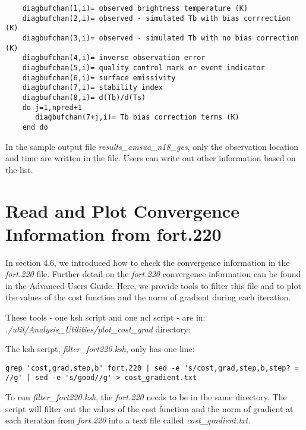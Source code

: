 \begin{scriptsize}
\begin{verbatim}  
    diagbufchan(1,i)= observed brightness temperature (K)
    diagbufchan(2,i)= observed - simulated Tb with bias corrrection (K)
    diagbufchan(3,i)= observed - simulated Tb with no bias correction (K)
    diagbufchan(4,i)= inverse observation error
    diagbufchan(5,i)= quality control mark or event indicator
    diagbufchan(6,i)= surface emissivity
    diagbufchan(7,i)= stability index
    diagbufchan(8,i)= d(Tb)/d(Ts)
    do j=1,npred+1
       diagbufchan(7+j,i)= Tb bias correction terms (K)
    end do
\end{verbatim}
\end{scriptsize}

In the sample output file \textit{results\_amsua\_n18\_ges}, only the observation location and time are written in the file. Users can write out other information based on the list. 

\section{Read and Plot Convergence Information from fort.220}

In section 4.6, we introduced how to check the convergence information in the \textit{fort.220} file.  Further detail on the \textit{fort.220} convergence information can be found in the Advanced User\textquotesingle s Guide. Here, we provide tools to filter this file and to plot the values of the cost function and the norm of gradient during each iteration.

These tools - one ksh script and one ncl script - are in:
\textit{./util/Analysis\_Utilities/plot\_cost\_grad} directory:

The ksh script, \textit{filter\_fort220.ksh}, only has one line:
\begin{tiny}
\begin{verbatim}  
grep 'cost,grad,step,b' fort.220 | sed -e 's/cost,grad,step,b,step? =   //g' | sed -e 's/good//g' > cost_gradient.txt
\end{verbatim}
\end{tiny}

To run \textit{filter\_fort220.ksh}, the \textit{fort.220} needs to be in the same directory. The script will filter out the values of the cost function and the norm of gradient at each iteration from 
\textit{fort.220} into a text file called \textit{cost\_gradient.txt}. \\

